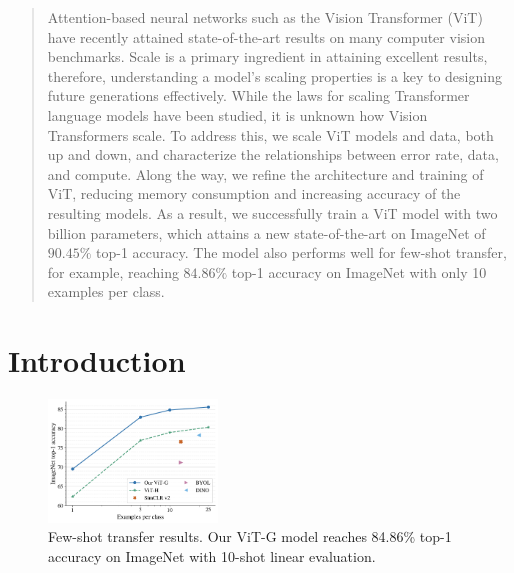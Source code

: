 \begin{abstract}

Attention-based neural networks such as the Vision Transformer (ViT) have recently attained state-of-the-art results on many computer vision benchmarks. Scale is a primary ingredient in attaining excellent results, therefore, understanding a model's scaling properties is a key to designing future generations effectively. While the laws for scaling Transformer language models have been studied, it is unknown how Vision Transformers scale. To address this, we scale ViT models and data, both up and down, and characterize the relationships between error rate, data, and compute. Along the way, we refine the architecture and training of ViT, reducing memory consumption and increasing accuracy of the resulting models. As a result, we successfully train a ViT model with two billion parameters, which attains a new state-of-the-art on ImageNet of $90.45\%$ top-1 accuracy. The model also performs well for few-shot transfer, for example, reaching $84.86\%$ top-1 accuracy on ImageNet with only 10 examples per class.

\end{abstract}

\section{Introduction}\label{sec:intro}

\begin{figure}[t]
  \begin{center}
    \includegraphics[width=0.4\textwidth]{figs/few_shot.pdf}
  \end{center}
  \vspace{-1em}
  \caption{Few-shot transfer results. Our ViT-G model reaches 84.86\% top-1 accuracy on ImageNet with 10-shot linear evaluation.}\label{fig:few_shot}
  \vspace{-0.8em}
\end{figure}

